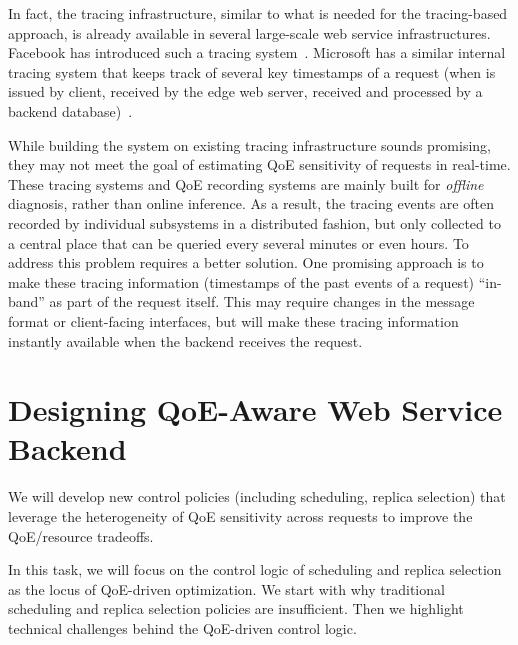 In fact, the tracing infrastructure, similar to what is needed for the tracing-based approach, is already available in several large-scale web service infrastructures. Facebook has introduced such a tracing system~\cite{mystery}. Microsoft has a similar internal tracing system that keeps track of several key timestamps of a request (\eg when is issued by client, received by the edge web server, received and processed by a backend database)~\cite{lecuyer2017harvesting,odin}.

While building the system on existing tracing infrastructure sounds promising,
they may not meet the goal of estimating QoE sensitivity of requests in real-time. 
These tracing systems and QoE recording systems are mainly built for {\em offline} diagnosis, rather than online inference. As a result, the tracing events are often recorded by individual subsystems in a distributed fashion, but only collected to a central place that can be queried every several minutes or even hours. 
To address this problem requires a better solution. 
One promising approach is to make these tracing information (\eg timestamps of the past events of a request) ``in-band'' as part of the request itself. This may require changes in the message format or client-facing interfaces, but will make these tracing information instantly available when the backend receives the request.


\section{Designing QoE-Aware Web Service Backend}
\label{sec:design}

\begin{task}
We will develop new control policies (including scheduling, replica selection) that leverage the heterogeneity of QoE sensitivity across requests to improve the QoE/resource tradeoffs.
\end{task}

In this task, we will focus on the control logic of scheduling and replica selection as the locus of QoE-driven optimization. 
We start with why traditional scheduling and replica selection policies are insufficient.
Then we highlight technical challenges behind the QoE-driven control logic.




